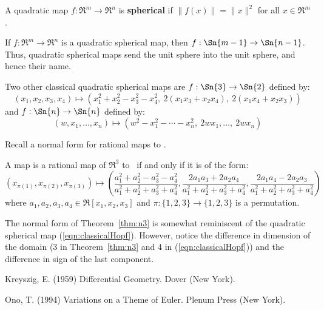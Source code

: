 \begin{defn2}
A quadratic map $f:\Re^m \rightarrow \Re^n$ is {\bf spherical} 
if $\| f(x) \| = \| x \|^2$ for all $x \in \Re^m$.
\end{defn2}

If $f:\Re^{m} \rightarrow \Re^{n}$ is a quadratic spherical map, 
then $f:\Sn{m-1} \rightarrow \Sn{n-1}$.
Thus, quadratic spherical maps send the unit sphere into the unit sphere,
and hence their name.

Two other classical quadratic spherical maps are 
$f:\Sn{3} \rightarrow \Sn{2}$ defined by:	%
\begin{equation}
\label{eqn:classicalHopf}
	(x_1,x_2,x_3,x_4) \mapsto 
	(x_1^2 + x_2^2 - x_3^2 - x_4^2,\ 
	 2(x_1 x_3 + x_2 x_4),\ 
	 2(x_1 x_4 + x_2 x_3))
\end{equation}
and $f:\Sn{n} \rightarrow \Sn{n}$ defined by: %
\begin{equation}
\label{eqn:HopfM}
	(w,x_1,\ldots,x_{n}) \mapsto
	(w^2 - x_1^2 - \cdots - x_{n}^2,\ 
	 2wx_1, \ldots,\ 2wx_{n})
\end{equation}
%

Recall a normal form for rational maps to .

\begin{theorem}
\label{thm:n3}
A map is a rational map of $\Re^3$ to \Sn{2}\ if and only if
it is of the form:
\[
(x_{\pi(1)},x_{\pi(2)},x_{\pi(3)}) \mapsto (\frac{a_1^2 + a_2^2 - a_3^2 - a_4^2}{a_1^2 + a_2^2 + a_3^2 + a_4^2},
		       \frac{2a_1a_3 + 2a_2a_4}{a_1^2 + a_2^2 + a_3^2 + a_4^2},
		       \frac{2a_1a_4 - 2a_2a_3}{a_1^2 + a_2^2 + a_3^2 + a_4^2})
\]
where $a_1,a_2,a_3,a_4 \in \Re[x_1,x_2,x_3]$
and $\pi : \{1,2,3\} \rightarrow \{1,2,3\}$ is a permutation.
\end{theorem}

\begin{example}
The normal form of Theorem~\ref{thm:n3} is somewhat reminiscent of the quadratic
spherical map (\ref{eqn:classicalHopf}).
However, notice the difference in dimension of the domain (3 in Theorem~\ref{thm:n3}
and 4 in (\ref{eqn:classicalHopf}))
and the difference in sign of the last component.
\end{example}


\begin{thebibliography}{Johnstone \& Williams 95}

Kreyszig, E. (1959) Differential Geometry.
Dover (New York).

Ono, T. (1994) Variations on a Theme of Euler.
Plenum Press (New York).

\end{thebibliography}


